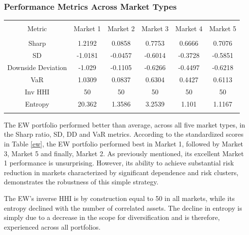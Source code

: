 \documentclass[11pt,preprint, authoryear]{elsarticle}
\let\origtable\table
\let\endorigtable\endtable
\renewenvironment{table}[1][2] {
    \expandafter\origtable\expandafter[H]
} {
    \endorigtable
}
\numberwithin{equation}{section}
\numberwithin{figure}{section}
\numberwithin{table}{section}
\begin{document}
\hypertarget{performance-metrics-across-market-types}{%
\subsubsection{\texorpdfstring{Performance Metrics Across Market Types
\label{perf}}{Performance Metrics Across Market Types }}\label{performance-metrics-across-market-types}}

\begin{table}[!htbp] \centering 
  \caption{Equal Weight} 
  \label{ew} 
\begin{tabular}{@{\extracolsep{5pt}} cccccc} 
\\[-1.8ex]\hline 
\hline \\[-1.8ex] 
Metric & Market 1 & Market 2 & Market 3 & Market 4 & Market 5 \\ 
\hline \\[-1.8ex] 
Sharp & 1.2192 & 0.0858 & 0.7753 & 0.6666 & 0.7076 \\ 
SD & -1.0181 & -0.0457 & -0.6014 & -0.3728 & -0.5851 \\ 
Downside Deviation & -1.029 & -0.1105 & -0.6266 & -0.4497 & -0.6218 \\ 
VaR & 1.0309 & 0.0837 & 0.6304 & 0.4427 & 0.6113 \\ 
Inv HHI & 50 & 50 & 50 & 50 & 50 \\ 
Entropy & 20.362 & 1.3586 & 3.2539 & 1.101 & 1.1167 \\ 
\hline \\[-1.8ex] 
\end{tabular} 
\end{table}

The EW portfolio performed better than average, across all five market
types, in the Sharp ratio, SD, DD and VaR metrics. According to the
standardized scores in Table \ref{ew}, the EW portfolio performed best
in Market 1, followed by Market 3, Market 5 and finally, Market 2. As
previously mentioned, its excellent Market 1 performance is
unsurprising. However, its ability to achieve substantial risk reduction
in markets characterized by significant dependence and risk clusters,
demonstrates the robustness of this simple strategy.

The EW's inverse HHI is by construction equal to 50 in all markets,
while its entropy declined with the number of correlated assets. The
decline in entropy is simply due to a decrease in the scope for
diversification and is therefore, experienced across all portfolios.
\end{document}
